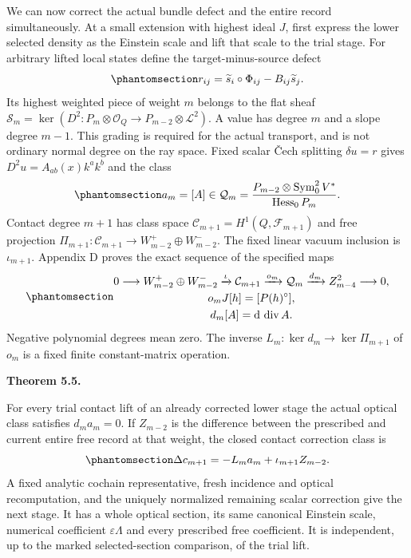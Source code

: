 \documentclass[
  english,
  11pt,
  reqno]{amsart}
\makeatletter
\newcommand{\pandocstatementheading}[1]{%
  \par\addpenalty{\@beginparpenalty}%
  \addvspace{.5\baselineskip plus .2\baselineskip minus .2\baselineskip}%
  {\normalfont\bfseries #1\par}%
  \nobreak\@afterindenttrue\@afterheading
}
\makeatother
\begin{document}
We can now correct the actual bundle defect and the entire record
simultaneously. At a small extension with highest ideal \(J\), first
express the lower selected density as the Einstein scale and lift that
scale to the trial stage. For arbitrary lifted local states define the
target-minus-source defect
\begin{equation}\protect\phantomsection\label{eq:gg-optical-defect-sign}{
 r_{ij}=\widetilde s_i\circ\Phi_{ij}-B_{ij}\widetilde s_j .
}\end{equation} Its highest weighted piece of weight \(m\) belongs to
the flat sheaf \(\mathcal S_m=\ker(D^2:P_m\otimes\mathcal O_Q
\to P_{m-2}\otimes\mathcal L^2)\). A value has degree \(m\) and a slope
degree \(m-1\). This grading is required for the actual transport, and
is not ordinary normal degree on the ray space. Fixed scalar Čech
splitting \(\delta u=r\) gives \(D^2u=A_{ab}(x)k^ak^b\) and the class
\begin{equation}\protect\phantomsection\label{eq:gg-optical-obstruction-class}{
 a_m=[A]\in
 \mathcal Q_m=
 \frac{P_{m-2}\otimes\operatorname{Sym}^2_0V^*}
                   {\operatorname{Hess}_0P_m}.
}\end{equation} Contact degree \(m+1\) has class space
\(\mathcal C_{m+1}=H^1(Q,\mathcal F_{m+1})\) and free projection
\(\Pi_{m+1}:\mathcal C_{m+1}\to W_{m-2}^+\oplus W_{m-2}^-\). The fixed
linear vacuum inclusion is \(\iota_{m+1}\). Appendix D proves the exact
sequence of the specified maps
\begin{equation}\protect\phantomsection\label{eq:gg-optical-symbol-exact-sequence}{\begin{gathered}
0\longrightarrow W_{m-2}^+\oplus W_{m-2}^-
 \xrightarrow{\iota}\mathcal C_{m+1}
 \xrightarrow{o_m}\mathcal Q_m
 \xrightarrow{d_m}Z^2_{m-4}\longrightarrow0, \\
o_mJ[h]=[P(h)^\circ], \\
d_m[A]=\mathrm d\,\operatorname{div}A.
\end{gathered}}\end{equation} Negative polynomial degrees mean zero. The inverse
\(L_m:\ker d_m\to\ker\Pi_{m+1}\) of \(o_m\) is a fixed finite
constant-matrix operation.

\pandocstatementheading{\protect{}\label{thm:gg-compatible-correction}Theorem 5.5.}

For every trial contact lift of an already corrected lower stage the
actual optical class satisfies \(d_ma_m=0\). If \(Z_{m-2}\) is the
difference between the prescribed and current entire free record at that
weight, the closed contact correction class is
\begin{equation}\protect\phantomsection\label{eq:gg-simultaneous-correction}{
 \Delta c_{m+1}=-L_ma_m+\iota_{m+1}Z_{m-2}.
}\end{equation} A fixed analytic cochain representative, fresh incidence
and optical recomputation, and the uniquely normalized remaining scalar
correction give the next stage. It has a whole optical section, its same
canonical Einstein scale, numerical coefficient \(\varepsilon\Lambda\)
and every prescribed free coefficient. It is independent, up to the
marked selected-section comparison, of the trial lift.
\end{document}
